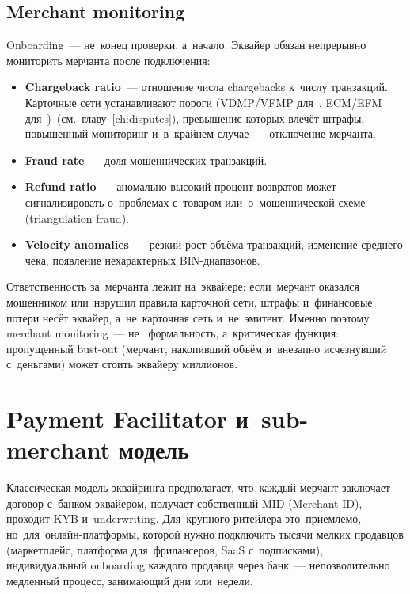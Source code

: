\subsection*{Merchant monitoring}

Onboarding~--- не~конец проверки, а~начало. Эквайер обязан
непрерывно мониторить мерчанта после подключения:

\begin{itemize}
  \item \textbf{Chargeback ratio}~--- отношение числа chargebacks
        к~числу транзакций. Карточные сети устанавливают пороги
        (VDMP/VFMP для~, ECM/EFM
        для~)~(см.~главу~\ref{ch:disputes}),
        превышение которых влечёт штрафы, повышенный мониторинг
        и~в~крайнем случае~--- отключение мерчанта.
  \item \textbf{Fraud rate}~--- доля мошеннических транзакций.
  \item \textbf{Refund ratio}~--- аномально высокий процент
        возвратов может сигнализировать о~проблемах с~товаром
        или~о~мошеннической схеме (triangulation fraud).
  \item \textbf{Velocity anomalies}~--- резкий рост объёма
        транзакций, изменение среднего чека, появление
        нехарактерных BIN-диапазонов.
\end{itemize}

\begin{important}
  Ответственность за~мерчанта лежит на~эквайере: если~мерчант
  оказался мошенником или~нарушил правила карточной сети,
  штрафы и~финансовые потери несёт эквайер, а~не~карточная сеть
  и~не~эмитент. Именно поэтому merchant monitoring~--- не~
  формальность, а~критическая функция: пропущенный bust-out
  (мерчант, накопивший объём и~внезапно исчезнувший с~деньгами)
  может стоить эквайеру миллионов.
\end{important}


\section{Payment Facilitator и~sub-merchant модель}
\label{sec:ia-payfac}

Классическая модель эквайринга предполагает, что~каждый мерчант
заключает договор с~банком-эквайером, получает собственный
MID (Merchant ID), проходит KYB и~underwriting. Для~крупного
ритейлера это~приемлемо, но~для~онлайн-платформы, которой
нужно подключить тысячи мелких продавцов (маркетплейс,
платформа для~фрилансеров, SaaS с~подписками), индивидуальный
onboarding каждого продавца через банк~--- непозволительно
медленный процесс, занимающий дни или~недели.

